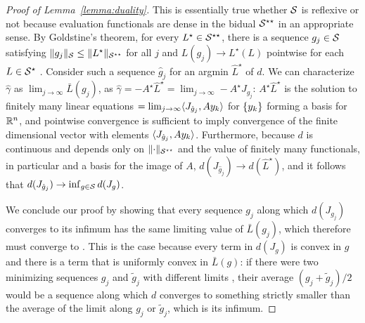 \begin{proof}[Proof of Lemma~\ref{lemma:duality}]
This is essentially true whether $\S$ is reflexive or not because evaluation functionals are dense in the bidual $\S^{\star\star}$ in an appropriate sense.
By Goldstine's theorem, for every $L^{\star} \in \S^{\star\star}$, there is a sequence $g_j \in \S$ satisfying $\norm{g_j}_{\S} \le \norm{L^{\star}}_{\S^{\star\star}}$
for all $j$ and $L(g_j) \to L^{\star}(L)$ pointwise for each $L \in \S^{\star}$ \citep[e.g.,][Theorem 2.6.26]{megginson2012introduction}.
Consider such a sequence $\hat g_j$ for an argmin $\hat L^{\star}$ of $d$. We can characterize $\hat \gamma$ as $\lim_{j \to \infty} \bar L(g_j)$,
as $\hat \gamma = -A^{\star}\hat L^{\star} = \lim_{j \to \infty} -A^{\star} J_{g_j}$: $A^{\star}\hat L^{\star}$ is the solution to finitely many linear equations 
 $= \lim_{j \to \infty} \inner{J_{\hat g_j}, Ay_k}$ 
for $\set{ y_k }$ forming a basis for $\R^n$, and pointwise convergence is sufficient to imply convergence 
of the finite dimensional vector with elements $\inner{J_{\hat g_j}, Ay_k}$. 
Furthermore, because $d$ is continuous and depends only on $\norm{\cdot}_{\S^{\star\star}}$ and the value of finitely many functionals, in particular  
and a basis for the image of $A$, $d(J_{\hat g_j}) \to d(\hat L^{\star})$, and it follows that
$d(J_{\hat g_j}) \to \inf_{g \in \S}d(J_{g})$.

We conclude our proof by showing that every sequence $g_j$ along which $d(J_{g_j})$ converges to its infimum has the 
same limiting value of $\bar L(g_j)$, which therefore must converge to .
This is the case because every term in $d(J_{g})$ is convex in $g$ and 
there is a term that is uniformly convex in $\bar L(g)$: 
if there were two minimizing sequences $g_j$ and $\tilde g_j$ with different limits 
, 
their average $(g_j + \tilde g_j) / 2$ would be a sequence along which $d$ converges to 
something strictly smaller than the average of the limit along $g_j$ or $\tilde g_j$, which is its infimum.
\end{proof}

